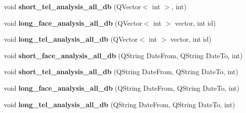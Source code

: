 \begin{DoxyCompactItemize}
void {\bfseries short\+\_\+tel\+\_\+analysis\+\_\+all\+\_\+db} (Q\+Vector$<$ int $>$, int)
\item 
\mbox{\label{class_for__analysis_ac386d1162ad2e293d5ae165cf63e5a38}} 
void {\bfseries long\+\_\+face\+\_\+analysis\+\_\+all\+\_\+db} (Q\+Vector$<$ int $>$ vector, int id)
\item 
\mbox{\label{class_for__analysis_ab3a1672e379e83c3992cf60f24af0f83}} 
void {\bfseries long\+\_\+tel\+\_\+analysis\+\_\+all\+\_\+db} (Q\+Vector$<$ int $>$ vector, int id)
\item 
\mbox{\label{class_for__analysis_a58b6c29ccb5295be0573781a8c8f1192}} 
void {\bfseries short\+\_\+face\+\_\+analysis\+\_\+all\+\_\+db} (Q\+String Date\+From, Q\+String Date\+To, int)
\item 
\mbox{\label{class_for__analysis_aaacd7ea6a36bb394a83f767e8429f024}} 
void {\bfseries short\+\_\+tel\+\_\+analysis\+\_\+all\+\_\+db} (Q\+String Date\+From, Q\+String Date\+To, int)
\item 
\mbox{\label{class_for__analysis_a6d8e43c86390ef2a9547f363a7aefa9e}} 
void {\bfseries long\+\_\+face\+\_\+analysis\+\_\+all\+\_\+db} (Q\+String Date\+From, Q\+String Date\+To, int)
\item 
\mbox{\label{class_for__analysis_acd511f265876c757057d326cf86d9d02}} 
void {\bfseries long\+\_\+tel\+\_\+analysis\+\_\+all\+\_\+db} (Q\+String Date\+From, Q\+String Date\+To, int)
\end{DoxyCompactItemize}
